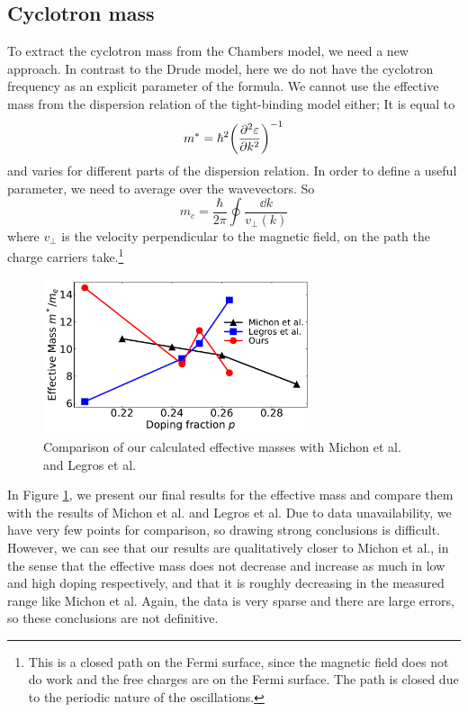 \subsection{Cyclotron mass}
To extract the cyclotron mass from the Chambers model, we need a new approach. In contrast to the
Drude model, here we do not have the cyclotron frequency as an explicit parameter of the formula.
We cannot use the effective mass from the dispersion relation of the tight-binding model either;
It is equal to
\begin{equation}
    m^* = \hbar^2\qty(\pdv[2]{\varepsilon}{k})^{-1}
\end{equation}
and varies for different parts of the dispersion relation. In order to define a useful parameter,
we need to average over the wavevectors. So
\begin{equation}
    m_c = \frac{\hbar}{2\pi}\oint\frac{\dd{k}}{v_\perp (k)}
\end{equation}
where $v_\perp$ is the velocity perpendicular to the magnetic field, on the path the charge
carriers take.\footnote{This is a closed path on the Fermi surface, since the magnetic field does
not do work and the free charges are on the Fermi surface. The path is closed due to the periodic
nature of the oscillations.}

\begin{figure}
    \centering
    \includegraphics[width=0.7\textwidth]{figures/effective_mass}
    \caption{Comparison of our calculated effective masses with Michon et al. and Legros et al.}
    \label{fig:effective_mass}
\end{figure}

In Figure \ref{fig:effective_mass}, we present our final results for the effective mass and compare
them with the results of Michon et al. and Legros et al. Due to data unavailability, we have very
few points for comparison, so drawing strong conclusions is difficult. However, we can see that
our results are qualitatively closer to Michon et al., in the sense that the effective mass does
not decrease and increase as much in low and high doping respectively, and that it is roughly
decreasing in the measured range like Michon et al. Again, the data is very sparse and there are
large errors, so these conclusions are not definitive.
